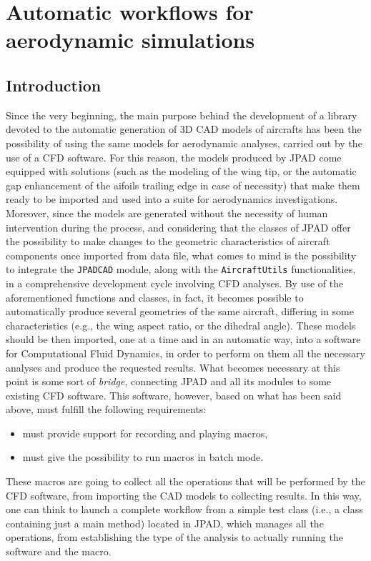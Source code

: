 \chapter{Automatic workflows for aerodynamic simulations}
\label{chap4}

\section{Introduction}
\label{sec4.1}

Since the very beginning, the main purpose behind the development of a library devoted to the automatic generation of 3D \gls{CAD} models of aircrafts has been the possibility of using the same models for aerodynamic analyses, carried out by the use of a \gls{CFD} software. For this reason, the models produced by \gls{JPAD} come equipped with solutions (such as the modeling of the wing tip, or the automatic gap enhancement of the aifoils trailing edge in case of necessity) that make them ready to be imported and used into a suite for aerodynamics investigations. Moreover, since the models are generated without the necessity of human intervention during the process, and considering that the classes of \gls{JPAD} offer the possibility to make changes to the geometric characteristics of aircraft components once imported from data file, what comes to mind is the possibility to integrate the \lstinline[language=Java]!JPADCAD! module, along with the \lstinline[language=Java]!AircraftUtils! functionalities, in a comprehensive development cycle involving \gls{CFD} analyses. By use of the aforementioned functions and classes, in fact, it becomes possible to automatically produce several geometries of the same aircraft, differing in some characteristics (e.g., the wing aspect ratio, or the dihedral angle). These models should be then imported, one at a time and in an automatic way, into a software for Computational Fluid Dynamics, in order to perform on them all the necessary analyses and produce the requested results. What becomes necessary at this point is some sort of \emph{bridge}, connecting \gls{JPAD} and all its modules to some existing \gls{CFD} software. This software, however, based on what has been said above, must fulfill the following requirements:
%
\begin{itemize}
\item must provide support for recording and playing macros,
\item must give the possibility to run macros in batch mode.
\end{itemize}   
%
These macros are going to collect all the operations that will be performed by the \gls{CFD} software, from importing the \gls{CAD} models to collecting results. In this way, one can think to launch a complete workflow from a simple test class (i.e., a class containing just a main method) located in \gls{JPAD}, which manages all the operations, from establishing the type of the analysis to actually running the software and the macro. 

